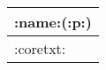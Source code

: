 \begin{center}
\begin{tabular}{ |p{5cm}| } 
\hline
\multicolumn{1}{|c|}{:name:(:p:)}
\\ 
\hline
:coretxt:
\\
\hline
\end{tabular}
\end{center}
